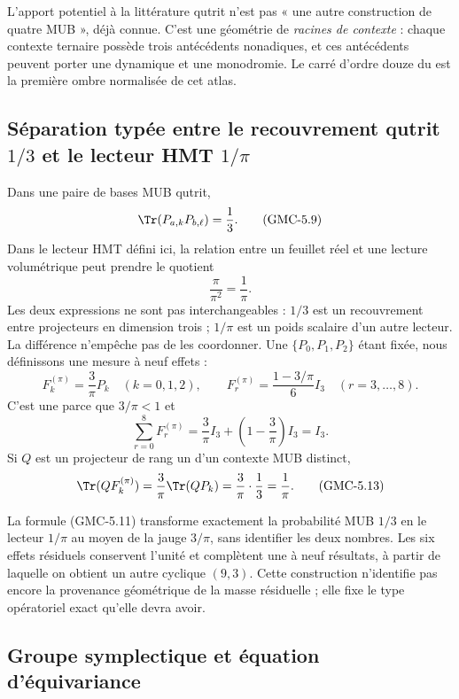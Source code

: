 L’apport potentiel à la littérature qutrit n’est pas « une autre construction de
quatre MUB », déjà connue. C’est une géométrie de \emph{racines de contexte} : chaque
contexte ternaire possède trois antécédents nonadiques, et ces antécédents
peuvent porter une dynamique et une monodromie. Le carré d’ordre douze du
 est la première ombre normalisée de cet atlas.

\subsection{Séparation typée entre le recouvrement qutrit
\texorpdfstring{$1/3$}{1/3} et le lecteur HMT
\texorpdfstring{$1/\pi$}{1/pi}}

Dans une paire de bases MUB qutrit,
\[
 \Tr(P_{a,k}P_{b,\ell})=\frac13.
 \tag{GMC-5.9}
\]
Dans le lecteur HMT défini ici, la relation entre un feuillet réel et une
lecture volumétrique peut prendre le quotient
\[
 \frac{\pi}{\pi^2}=\frac1\pi.
 \tag{GMC-5.10}
\]
Les deux expressions ne sont pas interchangeables : $1/3$ est un recouvrement entre
projecteurs en dimension trois ; $1/\pi$ est un poids scalaire d’un autre lecteur.
La différence n’empêche pas de les coordonner. Une \PVM
$\{P_0,P_1,P_2\}$ étant fixée, nous définissons une mesure à neuf effets :
\[
 F_k^{(\pi)}=\frac3\pi P_k\quad(k=0,1,2),
 \qquad
 F_r^{(\pi)}=\frac{1-3/\pi}{6}I_3\quad(r=3,\ldots,8).
 \tag{GMC-5.11}
\]
C’est une \POVM parce que $3/\pi<1$ et
\[
 \sum_{r=0}^{8}F_r^{(\pi)}
 =\frac3\pi I_3+\left(1-\frac3\pi\right)I_3=I_3.
 \tag{GMC-5.12}
\]
Si $Q$ est un projecteur de rang un d’un contexte MUB distinct,
\[
 \Tr(QF_k^{(\pi)})
 =\frac3\pi\Tr(QP_k)
 =\frac3\pi\cdot\frac13
 =\frac1\pi.
 \tag{GMC-5.13}
\]

\begin{bridgebox}
La formule \textup{(GMC-5.11)} transforme exactement la probabilité MUB $1/3$ en
le lecteur $1/\pi$ au moyen de la jauge $3/\pi$, sans identifier les deux nombres.
Les six effets résiduels conservent l’unité et complètent une \POVM à
neuf résultats, à partir de laquelle on obtient un autre \QMS cyclique $(9,3)$. Cette
construction n’identifie pas encore la provenance géométrique de la masse
résiduelle ; elle fixe le type opératoriel exact qu’elle devra avoir.
\end{bridgebox}

\subsection{Groupe symplectique et équation d’équivariance}

